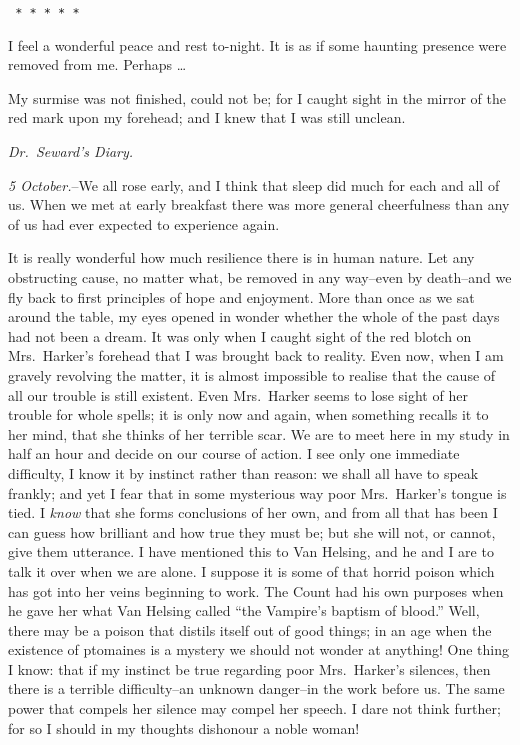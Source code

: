 \documentclass[12pt,openright]{book}
\begin{document}
\texttt{   *       *       *       *       *}

I feel a wonderful peace and rest to-night. It is as if some haunting presence were removed from me. Perhaps …

My surmise was not finished, could not be; for I caught sight in the mirror of the red mark upon my forehead; and I knew that I was still unclean.

\textit{Dr. Seward’s Diary.}

\textit{5 October.}–We all rose early, and I think that sleep did much for each and all of us. When we met at early breakfast there was more general cheerfulness than any of us had ever expected to experience again.

It is really wonderful how much resilience there is in human nature. Let any obstructing cause, no matter what, be removed in any way–even by death–and we fly back to first principles of hope and enjoyment. More than once as we sat around the table, my eyes opened in wonder whether the whole of the past days had not been a dream. It was only when I caught sight of the red blotch on Mrs. Harker’s forehead that I was brought back to reality. Even now, when I am gravely revolving the matter, it is almost impossible to realise that the cause of all our trouble is still existent. Even Mrs. Harker seems to lose sight of her trouble for whole spells; it is only now and again, when something recalls it to her mind, that she thinks of her terrible scar. We are to meet here in my study in half an hour and decide on our course of action. I see only one immediate difficulty, I know it by instinct rather than reason: we shall all have to speak frankly; and yet I fear that in some mysterious way poor Mrs. Harker’s tongue is tied. I \textit{know} that she forms conclusions of her own, and from all that has been I can guess how brilliant and how true they must be; but she will not, or cannot, give them utterance. I have mentioned this to Van Helsing, and he and I are to talk it over when we are alone. I suppose it is some of that horrid poison which has got into her veins beginning to work. The Count had his own purposes when he gave her what Van Helsing called “the Vampire’s baptism of blood.” Well, there may be a poison that distils itself out of good things; in an age when the existence of ptomaines is a mystery we should not wonder at anything! One thing I know: that if my instinct be true regarding poor Mrs. Harker’s silences, then there is a terrible difficulty–an unknown danger–in the work before us. The same power that compels her silence may compel her speech. I dare not think further; for so I should in my thoughts dishonour a noble woman!
\end{document}
